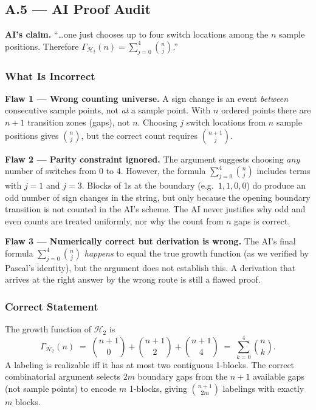 \documentclass{article}
\begin{document}
\subsection{A.5 --- AI Proof Audit}
 
\begin{notebox}
\textbf{AI's claim.}
``\ldots one just chooses up to four switch locations among the $n$ sample
positions.  Therefore $\Gamma_{\mathcal{H}_2}(n)=\sum_{j=0}^{4}\binom{n}{j}$.''
\end{notebox}
 
\subsubsection{What Is Incorrect}
 
\textbf{Flaw 1 --- Wrong counting universe.}
A sign change is an event \emph{between} consecutive sample points, not
\emph{at} a sample point.  With $n$ ordered points there are $n+1$ transition
zones (gaps), not $n$.  Choosing $j$ switch locations from $n$ sample
positions gives $\binom{n}{j}$, but the correct count requires
$\binom{n+1}{j}$.
 
\textbf{Flaw 2 --- Parity constraint ignored.}
The argument suggests choosing \emph{any} number of switches from 0 to 4.
However, the formula $\sum_{j=0}^{4}\binom{n}{j}$ includes terms with $j=1$
and $j=3$.  Blocks of 1s at the boundary (e.g.\ $1,1,0,0$) do produce an odd
number of sign changes in the string, but only because the opening boundary
transition is not counted in the AI's scheme.  The AI never justifies why odd
and even counts are treated uniformly, nor why the count from $n$ gaps is
correct.
 
\textbf{Flaw 3 --- Numerically correct but derivation is wrong.}
The AI's final formula $\sum_{j=0}^{4}\binom{n}{j}$ \emph{happens} to equal
the true growth function (as we verified by Pascal's identity), but the
argument does not establish this.  A derivation that arrives at the right
answer by the wrong route is still a flawed proof.
 
\subsubsection{Correct Statement}
 
\begin{theorem}
The growth function of $\mathcal{H}_2$ is
\[
  \Gamma_{\mathcal{H}_2}(n)
  \;=\;
  \binom{n+1}{0}+\binom{n+1}{2}+\binom{n+1}{4}
  \;=\;
  \sum_{k=0}^{4}\binom{n}{k}.
\]
A labeling is realizable iff it has at most two contiguous 1-blocks.
The correct combinatorial argument selects $2m$ boundary gaps from the
$n+1$ available gaps (not sample points) to encode $m$ 1-blocks, giving
$\binom{n+1}{2m}$ labelings with exactly $m$ blocks.
\end{theorem}
 
\end{document}

